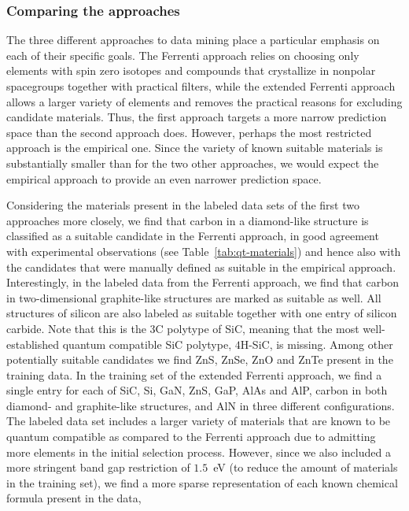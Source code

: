 \documentclass[superscriptaddress,unsortedaddress,
 amsmath,amssymb,
 aps,
]{revtex4-2}
\begin{document}
\subsubsection*{Comparing the approaches}
The three different approaches to data mining place a particular emphasis on each of their specific goals. The Ferrenti approach relies on choosing only elements with spin zero isotopes and compounds that crystallize in nonpolar spacegroups together with practical filters, while the extended Ferrenti approach allows a larger variety of elements and removes the practical reasons for excluding candidate materials. Thus, the first approach targets a more narrow prediction space than the second approach does. However, perhaps the most restricted approach is the empirical one. Since the variety of known suitable materials is substantially smaller than for the two other approaches, we would expect the empirical approach to provide an even narrower prediction space. %

Considering the materials present in the labeled data sets of the first two approaches more closely, we find that carbon in a diamond-like structure is classified as a suitable candidate in the Ferrenti approach, in good agreement with experimental observations (see Table~\ref{tab:qt-materials}) and hence also with the candidates that were manually defined as suitable in the empirical approach.   Interestingly, in the labeled data from the Ferrenti approach, we find that carbon in two-dimensional graphite-like structures are marked as suitable as well. All structures of silicon are also labeled as suitable together with one entry of silicon carbide. Note that this is the $3$C polytype of SiC, meaning that the most well-established quantum compatible SiC polytype, $4$H-SiC, is missing. 
Among other potentially suitable candidates we find ZnS, ZnSe, ZnO and ZnTe present in the training data.  
In the training set of the extended Ferrenti approach, we find a single entry for each of SiC, Si, GaN, ZnS, GaP, AlAs and AlP, carbon in both diamond- and graphite-like structures, and AlN in three different configurations. The labeled data set includes a larger variety of materials that are known to be quantum compatible as compared to the Ferrenti approach due to admitting more elements in the initial selection process. However, since we also included a more stringent band gap restriction of $1.5$~eV (to reduce the amount of materials in the training set), we find a more sparse representation of each known chemical formula present in the data, 
\end{document}
